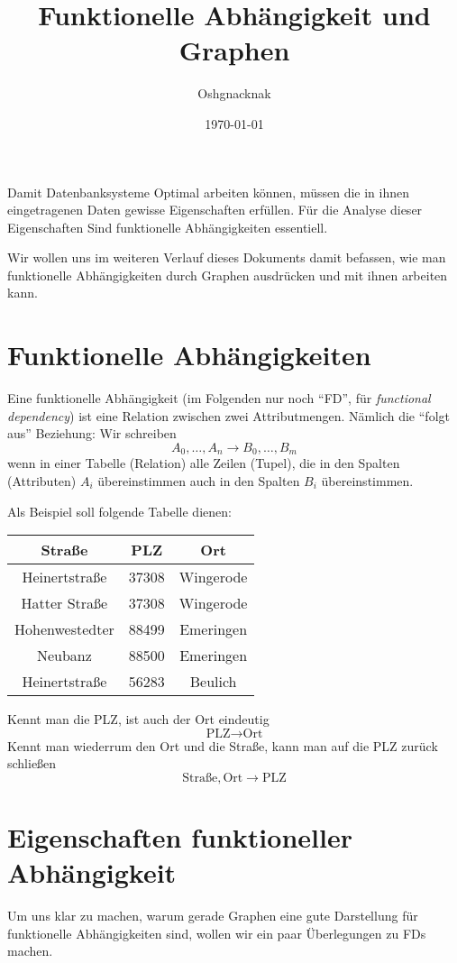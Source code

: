 \documentclass[a4paper, ngerman]{article}
\title{Funktionelle Abhängigkeit und Graphen}
\author{Oshgnacknak}
\date{\today}
\begin{document}
\maketitle

Damit Datenbanksysteme Optimal arbeiten können,
müssen die in ihnen eingetragenen Daten
gewisse Eigenschaften erfüllen.
Für die Analyse dieser Eigenschaften
Sind funktionelle Abhängigkeiten essentiell.

Wir wollen uns im weiteren Verlauf dieses Dokuments damit befassen,
wie man funktionelle Abhängigkeiten durch Graphen ausdrücken
und mit ihnen arbeiten kann.

\section*{Funktionelle Abhängigkeiten}
Eine funktionelle Abhängigkeit
(im Folgenden nur noch \enquote{FD}, für \emph{functional dependency})
ist eine Relation zwischen zwei Attributmengen.
Nämlich die \enquote{folgt aus} Beziehung:
Wir schreiben
$$
    A_0, \dots, A_n \to 
    B_0, \dots, B_m
$$
wenn in einer Tabelle (Relation) alle Zeilen (Tupel),
die in den Spalten (Attributen) $A_i$ übereinstimmen
auch in den Spalten $B_i$ übereinstimmen.

Als Beispiel soll folgende Tabelle dienen:
\begin{center}
\begin{tabular}{ c | c | c }
    Straße & PLZ & Ort \\
    \hline
    Heinertstraße & 37308 & Wingerode \\
    Hatter Straße & 37308 & Wingerode \\
    Hohenwestedter & 88499 & Emeringen \\
    Neubanz & 88500 & Emeringen \\
    Heinertstraße & 56283 & Beulich \\
\end{tabular}
\end{center}
Kennt man die PLZ, ist auch der Ort eindeutig
$$
    \text{PLZ} \to \text{Ort}
$$
Kennt man wiederrum den Ort und die Straße,
kann man auf die PLZ zurück schließen
$$
    \text{Straße}, \text{Ort} \to \text{PLZ}
$$

\section*{Eigenschaften funktioneller Abhängigkeit}
Um uns klar zu machen,
warum gerade Graphen eine gute Darstellung für
funktionelle Abhängigkeiten sind,
wollen wir ein paar Überlegungen zu FDs machen.
\end{document}
